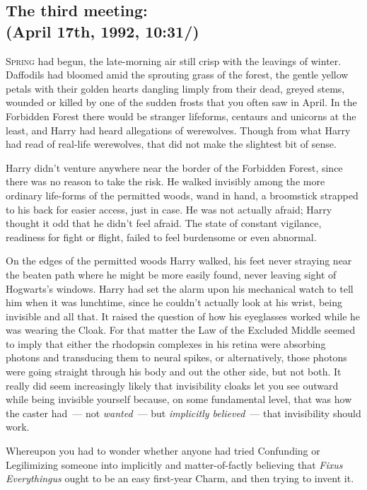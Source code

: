 
\subsection{The third meeting:\\
(April 17th, 1992, 10:31\AM/)}

\lettrine{S}{pring} had begun, the late-morning air still crisp with the leavings of winter.
Daffodils had bloomed amid the sprouting grass of the forest, the gentle yellow
petals with their golden hearts dangling limply from their dead, greyed stems,
wounded or killed by one of the sudden frosts that you often saw in April. In
the Forbidden Forest there would be stranger lifeforms, centaurs and unicorns
at the least, and Harry had heard allegations of werewolves. Though from what
Harry had read of real-life werewolves, that did not make the slightest bit of
sense.

Harry didn't venture anywhere near the border of the Forbidden Forest, since
there was no reason to take the risk. He walked invisibly among the more
ordinary life-forms of the permitted woods, wand in hand, a broomstick strapped
to his back for easier access, just in case. He was not actually afraid; Harry
thought it odd that he didn't feel afraid. The state of constant vigilance,
readiness for fight or flight, failed to feel burdensome or even abnormal.

On the edges of the permitted woods Harry walked, his feet never straying near
the beaten path where he might be more easily found, never leaving sight of
Hogwarts's windows. Harry had set the alarm upon his mechanical watch to tell
him when it was lunchtime, since he couldn't actually look at his wrist, being
invisible and all that. It raised the question of how his eyeglasses worked
while he was wearing the Cloak. For that matter the Law of the Excluded Middle
seemed to imply that either the rhodopsin complexes in his retina were
absorbing photons and transducing them to neural spikes, or alternatively,
those photons were going straight through his body and out the other side, but
not both. It really did seem increasingly likely that invisibility cloaks let
you see outward while being invisible yourself because, on some fundamental
level, that was how the caster had~--- not \emph{wanted}~--- but \emph{implicitly
believed}~--- that invisibility should work.

Whereupon you had to wonder whether anyone had tried Confunding or Legilimizing
someone into implicitly and matter-of-factly believing that \emph{Fixus
Everythingus} ought to be an easy first-year Charm, and then trying to invent
it.


